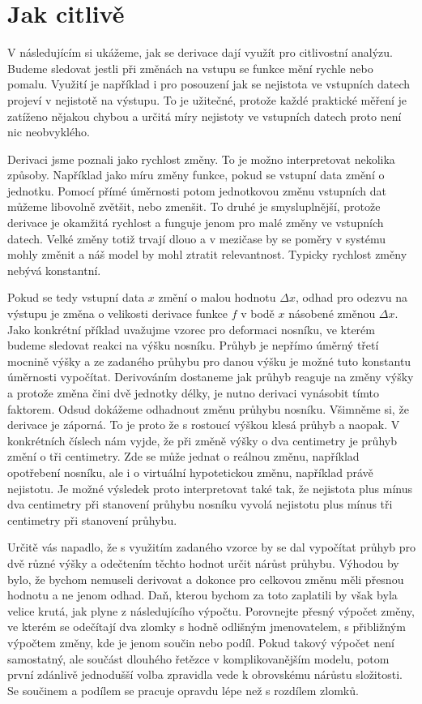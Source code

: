 \documentclass[12pt]{article}
\begin{document}
\section*{Jak citlivě}

V následujícím si ukážeme, jak se derivace dají využít pro citlivostní analýzu. Budeme sledovat jestli při změnách na vstupu se funkce mění rychle nebo pomalu. Využití je například i pro posouzení jak se nejistota ve vstupních datech projeví v nejistotě na výstupu. To je užitečné, protože každé praktické měření je zatíženo nějakou chybou a určitá míry nejistoty ve vstupních datech proto není nic neobvyklého.

Derivaci jsme poznali jako rychlost změny. To je možno interpretovat nekolika způsoby. Například jako míru změny funkce, pokud se vstupní data změní o jednotku. Pomocí přímé úměrnosti potom jednotkovou změnu vstupních dat můžeme libovolně zvětšit, nebo zmenšit. To druhé je smysluplnější, protože derivace je okamžitá rychlost a funguje jenom pro malé změny ve vstupních datech. Velké změny totiž trvají dlouo a v mezičase by se poměry v systému mohly změnit a náš model by mohl ztratit relevantnost. Typicky rychlost změny nebývá konstantní.

Pokud se tedy vstupní data $x$ změní o malou hodnotu $\Delta x$, odhad pro odezvu na výstupu je změna o velikosti derivace funkce $f$ v bodě $x$ násobené změnou $\Delta x$. Jako konkrétní příklad uvažujme vzorec pro deformaci nosníku, ve kterém budeme sledovat reakci na výšku nosníku. Průhyb je nepřímo úměrný třetí mocnině výšky a ze zadaného průhybu pro danou výšku je možné tuto konstantu úměrnosti vypočítat. Derivováním dostaneme jak průhyb reaguje na změny výšky a protože změna čini dvě jednotky délky, je nutno derivaci vynásobit tímto faktorem. Odsud dokážeme odhadnout změnu průhybu nosníku. Všimněme si, že derivace je záporná. To je proto že s rostoucí výškou klesá průhyb a naopak. V konkrétních číslech nám vyjde, že při změně výšky o dva centimetry je průhyb změní o tři centimetry. Zde se může jednat o reálnou změnu, například opotřebení nosníku, ale i o virtuální hypotetickou změnu, například právě nejistotu. Je možné výsledek proto interpretovat také tak, že nejistota plus mínus dva centimetry při stanovení průhybu nosníku vyvolá nejistotu plus mínus tři centimetry při stanovení průhybu.

Určitě vás napadlo, že s využitím zadaného vzorce by se dal vypočítat průhyb pro dvě různé výšky a odečtením těchto hodnot určit nárůst průhybu. Výhodou by bylo, že bychom nemuseli derivovat a dokonce pro celkovou změnu měli přesnou hodnotu a ne jenom odhad. Daň, kterou bychom za toto zaplatili by však byla velice krutá, jak plyne z následujícího výpočtu. Porovnejte přesný výpočet změny, ve kterém se odečítají dva zlomky s hodně odlišným jmenovatelem, s přibližným výpočtem změny, kde je jenom součin nebo podíl. Pokud takový výpočet není samostatný, ale součást dlouhého řetězce v komplikovanějším modelu, potom první zdánlivě jednodušší volba zpravidla vede k obrovskému nárůstu složitosti. Se součinem a podílem se pracuje opravdu lépe než s rozdílem zlomků. 
\end{document}
